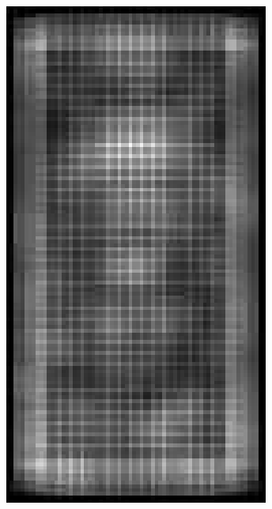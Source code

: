 \documentclass[thesis.tex]{subfiles}
\begin{document}
\begin{figure}[tb]
{\begin{subfigure}[t]{0.17\textwidth}
		\includegraphics[width=\textwidth]{img/inriaExampleDescriptorSvmMin.pdf}
		\caption{}
		\label{fig:inriaExampleDescriptorSvmMin}
		\vspace{2mm}
	\end{subfigure}
	\begin{subfigure}[t]{0.17\textwidth}

\end{subfigure}}
\end{figure}
\end{document}
